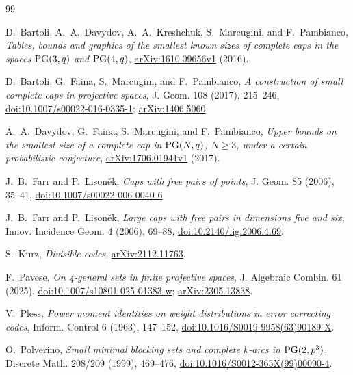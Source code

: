 \begin{thebibliography}{99}

D.~Bartoli, A.~A.~Davydov, A.~A.~Kreshchuk, S.~Marcugini, and F.~Pambianco,
\emph{Tables, bounds and graphics of the smallest known sizes of complete
caps in the spaces \(\mathrm{PG}(3,q)\) and \(\mathrm{PG}(4,q)\)},
\href{https://arxiv.org/abs/1610.09656}{arXiv:1610.09656v1} (2016).

D.~Bartoli, G.~Faina, S.~Marcugini, and F.~Pambianco,
\emph{A construction of small complete caps in projective spaces},
J. Geom. 108 (2017), 215--246,
\href{https://doi.org/10.1007/s00022-016-0335-1}{doi:10.1007/s00022-016-0335-1};
\href{https://arxiv.org/abs/1406.5060}{arXiv:1406.5060}.

A.~A.~Davydov, G.~Faina, S.~Marcugini, and F.~Pambianco,
\emph{Upper bounds on the smallest size of a complete cap in
\(\mathrm{PG}(N,q)\), \(N\ge3\), under a certain probabilistic conjecture},
\href{https://arxiv.org/abs/1706.01941}{arXiv:1706.01941v1} (2017).

J.~B.~Farr and P.~Lison\v{e}k,
\emph{Caps with free pairs of points}, J. Geom. 85 (2006), 35--41,
\href{https://doi.org/10.1007/s00022-006-0040-6}{doi:10.1007/s00022-006-0040-6}.

J.~B.~Farr and P.~Lison\v{e}k,
\emph{Large caps with free pairs in dimensions five and six},
Innov. Incidence Geom. 4 (2006), 69--88,
\href{https://doi.org/10.2140/iig.2006.4.69}{doi:10.2140/iig.2006.4.69}.

S.~Kurz,
\emph{Divisible codes},
\href{https://arxiv.org/abs/2112.11763}{arXiv:2112.11763}.

F.~Pavese,
\emph{On 4-general sets in finite projective spaces},
J. Algebraic Combin. 61 (2025),
\href{https://doi.org/10.1007/s10801-025-01383-w}{doi:10.1007/s10801-025-01383-w};
\href{https://arxiv.org/abs/2305.13838}{arXiv:2305.13838}.

V.~Pless,
\emph{Power moment identities on weight distributions in error correcting
codes}, Inform. Control 6 (1963), 147--152,
\href{https://doi.org/10.1016/S0019-9958(63)90189-X}{doi:10.1016/S0019-9958(63)90189-X}.

O.~Polverino,
\emph{Small minimal blocking sets and complete \(k\)-arcs in
\(\mathrm{PG}(2,p^3)\)}, Discrete Math. 208/209 (1999), 469--476,
\href{https://doi.org/10.1016/S0012-365X(99)00090-4}{doi:10.1016/S0012-365X(99)00090-4}.


\end{thebibliography}
